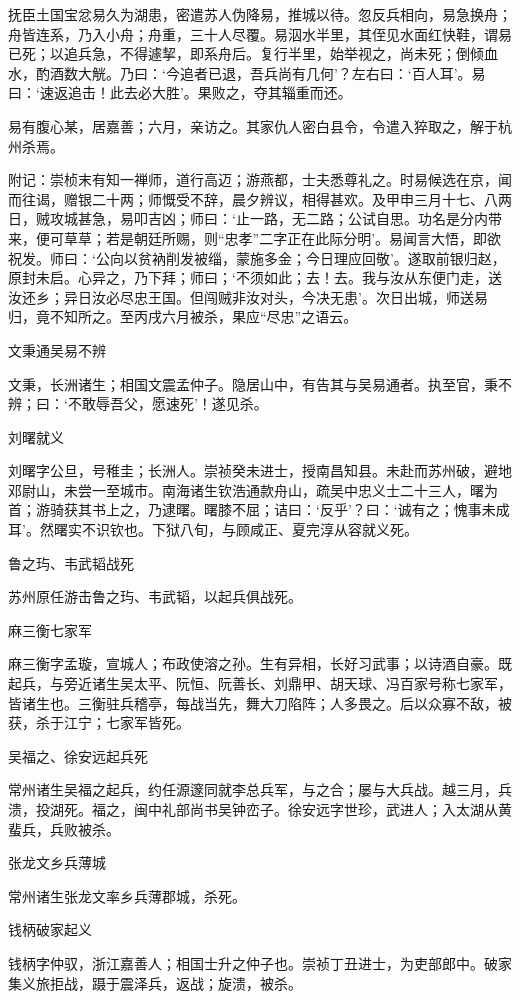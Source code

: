 \documentclass[]{article}
\begin{document}
抚臣土国宝忿易久为湖患，密遣苏人伪降易，推城以待。忽反兵相向，易急换舟；舟皆连系，乃入小舟；舟重，三十人尽覆。易泅水半里，其侄见水面红快鞋，谓易已死；以追兵急，不得遽挈，即系舟后。复行半里，始举视之，尚未死；倒倾血水，酌酒数大觥。乃曰：`今追者已退，吾兵尚有几何'？左右曰：`百人耳'。易曰：`速返追击！此去必大胜'。果败之，夺其辎重而还。

易有腹心某，居嘉善；六月，亲访之。其家仇人密白县令，令遣入猝取之，解于杭州杀焉。

附记：崇桢末有知一禅师，道行高迈；游燕都，士夫悉尊礼之。时易候选在京，闻而往谒，赠银二十两；师慨受不辞，晨夕辨议，相得甚欢。及甲申三月十七、八两日，贼攻城甚急，易叩吉凶；师曰：`止一路，无二路；公试自思。功名是分内带来，便可草草；若是朝廷所赐，则``忠孝''二字正在此际分明'。易闻言大悟，即欲祝发。师曰：`公向以贫衲削发被缁，蒙施多金；今日理应回敬'。遂取前银归赵，原封未启。心异之，乃下拜；师曰；`不须如此；去！去。我与汝从东便门走，送汝还乡；异日汝必尽忠王国。但闯贼非汝对头，今决无患'。次日出城，师送易归，竟不知所之。至丙戌六月被杀，果应``尽忠''之语云。

文秉通吴易不辨

文秉，长洲诸生；相国文震孟仲子。隐居山中，有告其与吴易通者。执至官，秉不辨；曰：`不敢辱吾父，愿速死'！遂见杀。

刘曙就义

刘曙字公旦，号稚圭；长洲人。崇祯癸未进士，授南昌知县。未赴而苏州破，避地邓尉山，未尝一至城市。南海诸生钦浩通款舟山，疏吴中忠义士二十三人，曙为首；游骑获其书上之，乃逮曙。曙膝不屈；诘曰：`反乎'？曰：`诚有之；愧事未成耳'。然曙实不识钦也。下狱八旬，与顾咸正、夏完淳从容就义死。

鲁之玙、韦武韬战死

苏州原任游击鲁之玙、韦武韬，以起兵俱战死。

麻三衡七家军

麻三衡字孟璇，宣城人；布政使溶之孙。生有异相，长好习武事；以诗酒自豪。既起兵，与旁近诸生吴太平、阮恒、阮善长、刘鼎甲、胡天球、冯百家号称七家军，皆诸生也。三衡驻兵稽亭，每战当先，舞大刀陷阵；人多畏之。后以众寡不敌，被获，杀于江宁；七家军皆死。

吴福之、徐安远起兵死

常州诸生吴福之起兵，约任源邃同就李总兵军，与之合；屡与大兵战。越三月，兵溃，投湖死。福之，闽中礼部尚书吴钟峦子。徐安远字世珍，武进人；入太湖从黄蜚兵，兵败被杀。

张龙文乡兵薄城

常州诸生张龙文率乡兵薄郡城，杀死。

钱柄破家起义

钱柄字仲驭，浙江嘉善人；相国士升之仲子也。崇祯丁丑进士，为吏部郎中。破家集义旅拒战，蹑于震泽兵，返战；旋溃，被杀。
\end{document}

